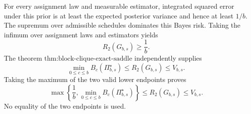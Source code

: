 For every assignment law and measurable estimator, integrated squared error under this prior is at least the expected posterior variance and hence at least \(1/b\). The supremum over admissible schedules dominates this Bayes risk. Taking the infimum over assignment laws and estimators yields
\[
R_2(G_{b,s})\geq\frac1b.
\]
The theorem \(\text{thm:block-clique-exact-saddle}\) independently supplies
\[
\min_{0\leq c\leq b}B_c(\Pi_{b,s}^{\star})
\leq R_2(G_{b,s})\leq V_{b,s}.
\]
Taking the maximum of the two valid lower endpoints proves
\[
\max\left\{\frac1b,\min_{0\leq c\leq b}B_c(\Pi_{b,s}^{\star})\right\}
\leq R_2(G_{b,s})\leq V_{b,s}.
\]
No equality of the two endpoints is used.